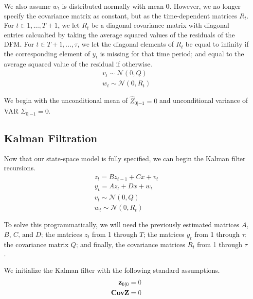 \documentclass[11pt, letterpaper]{article}\usepackage[]{graphicx}\usepackage[]{color}
\newcommand{\vv}[1]{\textcolor{black}{\mathbf{#1}}}
\begin{document}
We also assume $w_t$ is distributed normally with mean $0$. However, we no longer specify the covariance matrix as constant, but as the time-dependent matrices $R_t$. For $t \in 1, \dots, T+1$, we let $R_t$ be a diagonal covariance matrix with diagonal entries calcualted by taking the average squared values of the residuals of the DFM. For $t \in T+1, \dots, \tau$, we let the diagonal elements of $R_t$ be equal to infinity if the corresponding element of $y_t$ is missing for that time period; and equal to the average squared value of the residual if otherwise.
\begin{align*}
	v_t \sim \mathcal{N}(0, Q)\\
	w_t \sim \mathcal{N}(0, R_t)
\end{align*}

We begin with the unconditional mean of $\widehat{Z}_{0|-1} = 0$ and unconditional variance of VAR $\Sigma_{0|-1} = 0$.

\subsection{Kalman Filtration}
Now that our state-space model is fully specified, we can begin the Kalman filter recursions.
\begin{align*}
	z_t = B z_{t-1} + Cx + v_t\\
	y_t = A z_t + Dx + w_t\\
	v_t \sim \mathcal{N}(0, Q)\\
	w_t \sim \mathcal{N}(0, R_t)
\end{align*}

To solve this programmatically, we will need the previously estimated matrices $A$, $B$, $C$, and $D$; the matrices $z_t$ from 1 through $T$; the matrices $y_t$ from 1 through $\tau$; the covariance matrix $Q$; and finally, the covariance matrices $R_t$ from 1 through $\tau$.

We initialize the Kalman filter with the following standard assumptions. 
\begin{align*}
	\vv{z}_{0|0} = 0\\
	\vv{CovZ} = 0
\end{align*}
\end{document}
